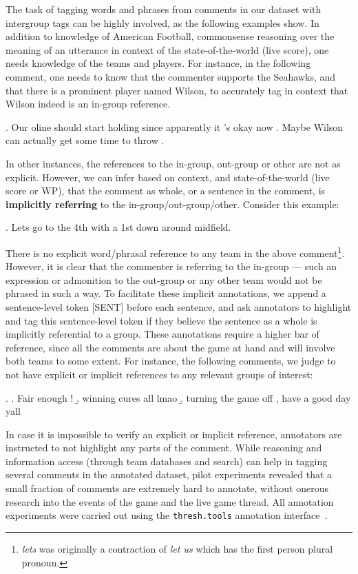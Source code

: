 The task of tagging words and phrases from comments in our dataset with intergroup tags can be highly involved, as the following examples show. In addition to knowledge of American Football, commonsense reasoning over the meaning of an utterance in context of the state-of-the-world (live score), one needs knowledge of the teams and players. For instance, in the following comment, one needs to know that the commenter supports the Seahawks, and that there is a prominent player named Wilson, to accurately tag in context that Wilson indeed is an in-group reference.

\ex. Our oline should start holding since apparently it ’s okay now . Maybe Wilson can actually get some time to throw .

In other instances, the references to the in-group, out-group or other are not as explicit. However, we can infer based on context, and state-of-the-world (live score or WP), that the comment as whole, or a sentence in the comment, is \textbf{implicitly referring} to the in-group/out-group/other. Consider this example:

\ex. Lets go to the 4th with a 1st down around midfield.

There is no explicit word/phrasal reference to any team in the above comment\footnote{\emph{lets} was originally a contraction of \emph{let us} which has the first person plural pronoun.}. However, it is clear that the commenter is referring to the in-group --- such an expression or admonition to the out-group or any other team would not be phrased in such a way. To facilitate these implicit annotations, we append a sentence-level token [SENT] before each sentence, and ask annotators to highlight and tag this sentence-level token if they believe the sentence as a whole is implicitly referential to a group. These annotations require a higher bar of reference, since all the comments are about the game at hand and will involve both teams to some extent. For instance, the following comments, we judge to not have explicit or implicit references to any relevant groups of interest:

\ex. \a. Fair enough !
     \b. winning cures all lmao
     \b. turning the game off , have a good day yall
     
In case it is impossible to verify an explicit or implicit reference, annotators are instructed to not highlight any parts of the comment. While reasoning and information access (through team databases and search) can help in tagging several comments in the annotated dataset, pilot experiments revealed that a small fraction of comments are extremely hard to annotate, without onerous research into the events of the game and the live game thread. All annotation experiments were carried out using the \texttt{thresh.tools} annotation interface~\citep{heineman2023thresh}.

